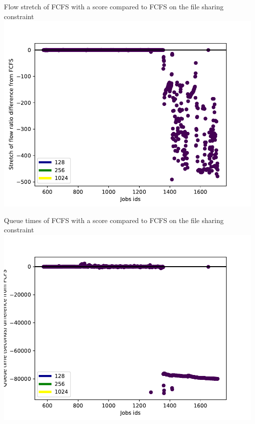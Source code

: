 \documentclass{libs/ufc_format}
\begin{document}
{\begin{frame}{Flow stretch of FCFS with a score compared to FCFS on the file sharing constraint}
	\center\includegraphics[scale=0.6]{../MBSS/plot/2022-02-08->2022-02-08_very_reduced_95_128_4_256_1_1024_FCFS_Score_x10_x7000_x0VSFCFS_stretch.pdf}
\end{frame}
\begin{frame}{Queue times of FCFS with a score compared to FCFS on the file sharing constraint}
	\center\includegraphics[scale=0.6]{../MBSS/plot/2022-02-08->2022-02-08_very_reduced_95_128_4_256_1_1024_FCFS_Score_x10_x7000_x0VSFCFS.pdf}
\end{frame}

}
\end{document}
